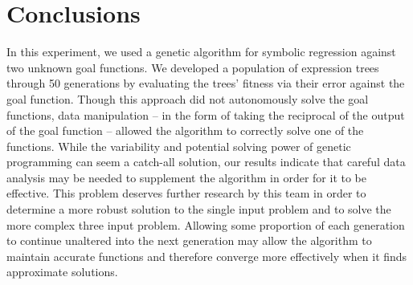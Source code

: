 
\section{Conclusions}
\label{sec:concl}

In this experiment, we used a genetic algorithm for symbolic regression against two unknown goal functions.  We developed a population of expression trees through 50 generations by evaluating the trees' fitness via their error against the goal function.  Though this approach did not autonomously solve the goal functions, data manipulation -- in the form of taking the reciprocal of the output of the goal function -- allowed the algorithm to correctly solve one of the functions.  While the variability and potential solving power of genetic programming can seem a catch-all solution, our results indicate that careful data analysis may be needed to supplement the algorithm in order for it to be effective.  This problem deserves further research by this team in order to determine a more robust solution to the single input problem and to solve the more complex three input problem.  Allowing some proportion of each generation to continue unaltered into the next generation may allow the algorithm to maintain accurate functions and therefore converge more effectively when it finds approximate solutions.  
